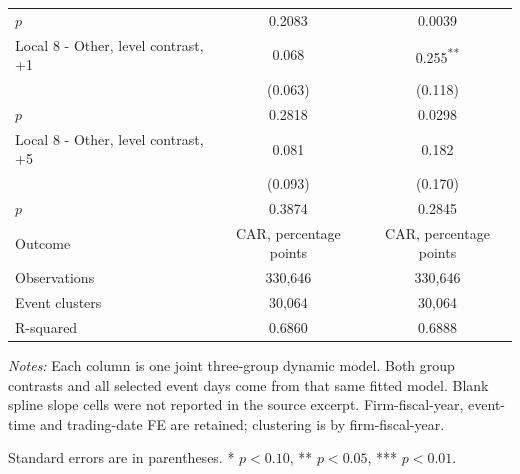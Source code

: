 \documentclass[10pt]{article}
\newcommand{\sym}[1]{\textsuperscript{#1}}
\begin{document}
\begin{minipage}{18.00cm}
\begin{tabular*}{\linewidth}{@{\extracolsep{\fill}}lcc@{}}
$p$ & 0.2083 & 0.0039 \\
Local 8 - Other, level contrast, +1 & 0.068 & 0.255\sym{**} \\
 & (0.063) & (0.118) \\
$p$ & 0.2818 & 0.0298 \\
Local 8 - Other, level contrast, +5 & 0.081 & 0.182 \\
 & (0.093) & (0.170) \\
$p$ & 0.3874 & 0.2845 \\
\midrule
Outcome & CAR, percentage points & CAR, percentage points \\
Observations & 330,646 & 330,646 \\
Event clusters & 30,064 & 30,064 \\
R-squared & 0.6860 & 0.6888 \\
\bottomrule\end{tabular*}\par\medskip
\fontsize{9}{11}\selectfont\textit{Notes:} Each column is one joint three-group dynamic model. Both group contrasts and all selected event days come from that same fitted model. Blank spline slope cells were not reported in the source excerpt. Firm-fiscal-year, event-time and trading-date FE are retained; clustering is by firm-fiscal-year.
\par Standard errors are in parentheses. * $p<0.10$, ** $p<0.05$, *** $p<0.01$.
\end{minipage}
\end{document}

